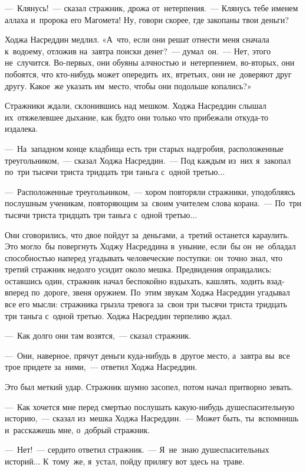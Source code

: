 \documentclass[12pt,a4paper]{book}
\begin{document}
—~Клянусь!~— сказал стражник, дрожа от~нетерпения.~— Клянусь тебе именем аллаха и~пророка его Магомета! Ну, говори скорее, где закопаны твои деньги?

Ходжа Насреддин медлил. «А~что, если они решат отнести меня сначала к~водоему, отложив на~завтра поиски денег?~— думал~он.~— Нет, этого не~случится. Во-первых, они обуяны алчностью и~нетерпением, во-вторых, они побоятся, что кто-нибудь может опередить~их, втретьих, они не~доверяют друг другу. Какое~же указать им~место, чтобы они подольше копались?»

Стражники ждали, склонившись над мешком. Ходжа Насреддин слышал их~отяжелевшее дыхание, как будто они только что прибежали откуда-то издалека.

—~На~западном конце кладбища есть три старых надгробия, расположенные треугольником,~— сказал Ходжа Насреддин.~— Под каждым из~них я~закопал по~три тысячи триста тридцать три таньга с~одной третью...

—~Расположенные треугольником,~— хором повторяли стражники, уподобляясь послушным ученикам, повторяющим за~своим учителем слова корана.~— По~три тысячи триста тридцать три таньга с~одной третью...

Они сговорились, что двое пойдут за~деньгами, а~третий останется караулить. Это могло~бы повергнуть Ходжу Насреддина в~уныние, если~бы он~не~обладал способностью наперед угадывать человеческие поступки: он~точно знал, что третий стражник недолго усидит около мешка. Предвидения оправдались: оставшись один, стражник начал беспокойно вздыхать, кашлять, ходить взад-вперед по~дороге, звеня оружием. По~этим звукам Ходжа Насреддин угадывал все его мысли: стражника грызла тревога за~свои три тысячи триста тридцать три таньга с~одной третью. Ходжа Насреддин терпеливо ждал.

—~Как долго они там возятся,~— сказал стражник.

—~Они, наверное, прячут деньги куда-нибудь в~другое место, а~завтра вы~все трое придете за~ними,~— ответил Ходжа Насреддин.

Это был меткий удар. Стражник шумно засопел, потом начал притворно зевать.

—~Как хочется мне перед смертью послушать какую-нибудь душеспасительную историю,~— сказал из~мешка Ходжа Насреддин.~— Может быть, ты~вспомнишь и~расскажешь мне, о~добрый стражник.

—~Нет!~— сердито ответил стражник.~— Я~не~знаю душеспасительных историй... К~тому~же, я~устал, пойду прилягу вот здесь на~траве.
\end{document}
